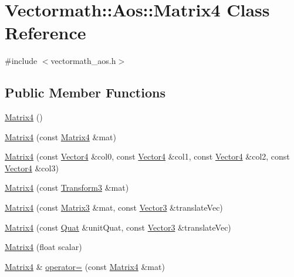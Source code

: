 \hypertarget{classVectormath_1_1Aos_1_1Matrix4}{\section{Vectormath\-:\-:Aos\-:\-:Matrix4 Class Reference}
\label{classVectormath_1_1Aos_1_1Matrix4}
}


{\ttfamily \#include $<$vectormath\-\_\-aos.\-h$>$}

\subsection*{Public Member Functions}
\begin{DoxyCompactItemize}
\item 
\hyperlink{classVectormath_1_1Aos_1_1Matrix4_a37fd3dbd4a7b1a72707b394e550d79c7}{Matrix4} ()
\item 
\hyperlink{classVectormath_1_1Aos_1_1Matrix4_a025fe2cfa1581016444f2306c1112344}{Matrix4} (const \hyperlink{classVectormath_1_1Aos_1_1Matrix4}{Matrix4} \&mat)
\item 
\hyperlink{classVectormath_1_1Aos_1_1Matrix4_aacf4de7f6db283ad9004ca4328786ce9}{Matrix4} (const \hyperlink{classVectormath_1_1Aos_1_1Vector4}{Vector4} \&col0, const \hyperlink{classVectormath_1_1Aos_1_1Vector4}{Vector4} \&col1, const \hyperlink{classVectormath_1_1Aos_1_1Vector4}{Vector4} \&col2, const \hyperlink{classVectormath_1_1Aos_1_1Vector4}{Vector4} \&col3)
\item 
\hyperlink{classVectormath_1_1Aos_1_1Matrix4_a3fa883e2169015e3de19961e2c1256a1}{Matrix4} (const \hyperlink{classVectormath_1_1Aos_1_1Transform3}{Transform3} \&mat)
\item 
\hyperlink{classVectormath_1_1Aos_1_1Matrix4_ad5545bd33ad2e9d1447c815b3e905bca}{Matrix4} (const \hyperlink{classVectormath_1_1Aos_1_1Matrix3}{Matrix3} \&mat, const \hyperlink{classVectormath_1_1Aos_1_1Vector3}{Vector3} \&translate\-Vec)
\item 
\hyperlink{classVectormath_1_1Aos_1_1Matrix4_abec1bfbf4970db96b114ef8410243138}{Matrix4} (const \hyperlink{classVectormath_1_1Aos_1_1Quat}{Quat} \&unit\-Quat, const \hyperlink{classVectormath_1_1Aos_1_1Vector3}{Vector3} \&translate\-Vec)
\item 
\hyperlink{classVectormath_1_1Aos_1_1Matrix4_ad68959c1e281a215bc923cd8f9c0ce9f}{Matrix4} (float scalar)
\item 
\hyperlink{classVectormath_1_1Aos_1_1Matrix4}{Matrix4} \& \hyperlink{classVectormath_1_1Aos_1_1Matrix4_a0553a086f6a531ec33604bec921b39b1}{operator=} (const \hyperlink{classVectormath_1_1Aos_1_1Matrix4}{Matrix4} \&mat)

\end{DoxyCompactItemize}
